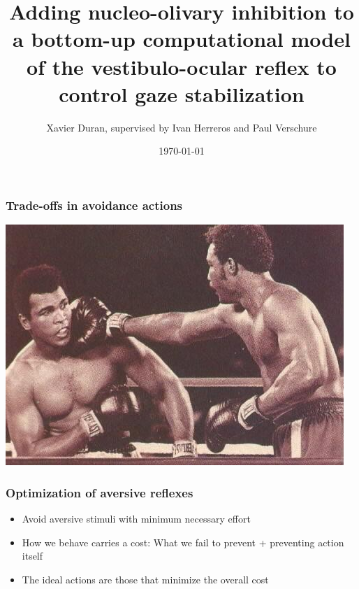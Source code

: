 \documentclass[10pt, compress]{beamer}
\title{Adding nucleo-olivary inhibition to a bottom-up computational model of the vestibulo-ocular reflex to control gaze stabilization}
\subtitle{}
\date{\today}
\author{Xavier Duran, supervised by Ivan Herreros and Paul Verschure}
\institute{Master in Cognitive Systems and Interactive Media}
\begin{document}
\maketitle


\begin{frame}[fragile]
  \frametitle{Trade-offs in avoidance actions}
  \centerline{\includegraphics[scale=0.6]{images/ali.png}}
\end{frame}


\begin{frame}[fragile]
  \frametitle{Optimization of aversive reflexes}
  \begin{itemize}
    \item Avoid aversive stimuli with minimum necessary effort
    \item How we behave carries a cost: What we fail to prevent + preventing action itself
    \item The ideal actions are those that minimize the overall cost
  \end{itemize}
  \cite{Brandi2013}
\end{frame}
\end{document}

